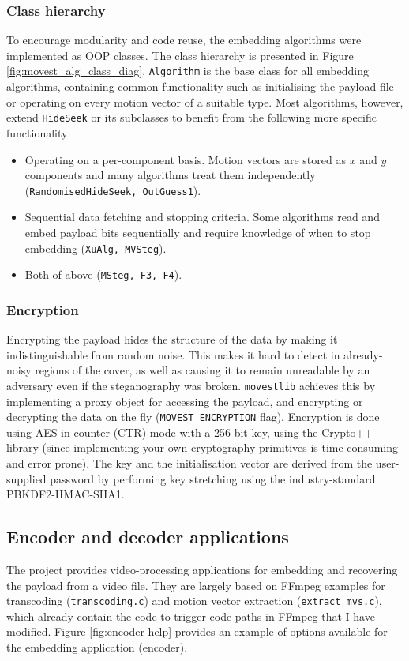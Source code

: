 \documentclass[12pt,british,twoside,notitlepage,usenames,dvipsnames,hypens,final]{report}
\numberwithin{equation}{section}
\numberwithin{figure}{section}
\begin{document}
\subsubsection{Class hierarchy}

To encourage modularity and code reuse, the embedding algorithms were implemented as OOP classes. The class hierarchy is presented in Figure \ref{fig:movest_alg_class_diag}. \texttt{Algorithm} is the base class for all embedding algorithms, containing common functionality such as initialising the payload file or operating on every motion vector of a suitable type. Most algorithms, however, extend \texttt{HideSeek} or its subclasses to benefit from the following more specific functionality:

\begin{itemize}
\item Operating on a per-component basis. Motion vectors are stored as $x$ and $y$ components and many algorithms treat them independently (\texttt{RandomisedHideSeek, OutGuess1}).
\item Sequential data fetching and stopping criteria. Some algorithms read and embed payload bits sequentially and require knowledge of when to stop embedding (\texttt{XuAlg, MVSteg}).
\item Both of above (\texttt{MSteg, F3, F4}).
\end{itemize}

\subsubsection{Encryption}
\label{encryption}
Encrypting the payload hides the structure of the data by making it indistinguishable from random noise. This makes it hard to detect in already-noisy regions of the cover, as well as causing it to remain unreadable by an adversary even if the steganography was broken. \texttt{movestlib} achieves this by implementing a proxy object for accessing the payload, and encrypting or decrypting the data on the fly (\texttt{MOVEST\_ENCRYPTION} flag). Encryption is done using AES in counter (CTR) mode with a 256-bit key, using the Crypto++ library (since implementing your own cryptography primitives is time consuming and error prone). The key and the initialisation vector are derived from the user-supplied password by performing key stretching using the industry-standard PBKDF2-HMAC-SHA1.

\subsection{Encoder and decoder applications}
\label{enc-dec-bin}
The project provides video-processing applications for embedding and recovering the payload from a video file. They are largely based on FFmpeg examples for transcoding (\texttt{transcoding.c}) and motion vector extraction (\texttt{extract\_mvs.c}), which already contain the code to trigger code paths in FFmpeg that I have modified. Figure \ref{fig:encoder-help} provides an example of options available for the embedding application (encoder).
\end{document}
